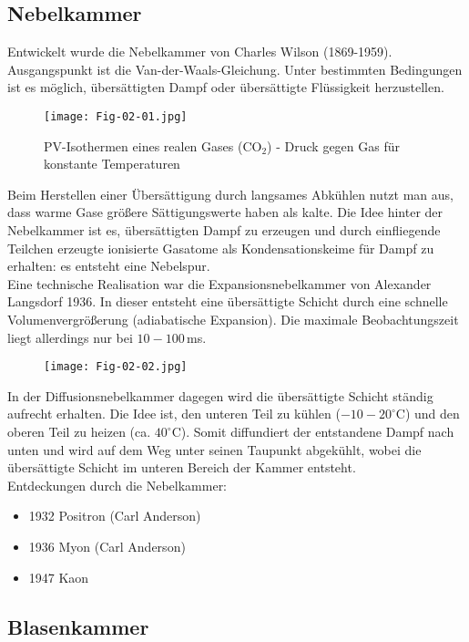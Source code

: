 \subsection{Nebelkammer}

Entwickelt wurde die Nebelkammer von Charles Wilson (1869-1959). Ausgangspunkt ist die
Van-der-Waals-Gleichung. Unter bestimmten Bedingungen ist es möglich, übersättigten Dampf oder
übersättigte Flüssigkeit herzustellen.

\begin{figure}[H]
	\centering
	\texttt{[image: Fig-02-01.jpg]}
	\caption{PV-Isothermen eines realen Gases (CO$_2$) - Druck gegen Gas für konstante Temperaturen}
\end{figure}

Beim Herstellen einer Übersättigung durch langsames Abkühlen nutzt man aus, dass warme Gase
größere Sättigungswerte haben als kalte. Die Idee hinter der Nebelkammer ist es, übersättigten Dampf
zu erzeugen und durch einfliegende Teilchen erzeugte ionisierte Gasatome als Kondensationskeime für
Dampf zu erhalten: es entsteht eine Nebelspur.
\\
Eine technische Realisation war die Expansionsnebelkammer von Alexander Langsdorf 1936. In dieser
entsteht eine übersättigte Schicht durch eine schnelle Volumenvergrößerung (adiabatische Expansion).
Die maximale Beobachtungszeit liegt allerdings nur bei $10-100\,$ms.

\begin{figure}[H]
	\centering
	\texttt{[image: Fig-02-02.jpg]}
\end{figure}

In der Diffusionsnebelkammer dagegen wird die übersättigte Schicht ständig aufrecht erhalten. Die
Idee ist, den unteren Teil zu kühlen ($-10-20^\circ$C) und den oberen Teil zu heizen (ca.
$40^\circ$C). Somit diffundiert der entstandene Dampf nach unten und wird auf dem Weg unter seinen
Taupunkt abgekühlt, wobei die übersättigte Schicht im unteren Bereich der Kammer entsteht. 
\\
Entdeckungen durch die Nebelkammer:

\begin{itemize}
  \item 1932 Positron (Carl Anderson)
  \item 1936 Myon (Carl Anderson)
  \item 1947 Kaon
\end{itemize}

\subsection{Blasenkammer}

